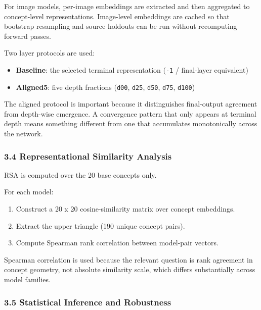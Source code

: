 \documentclass[
]{article}
\providecommand{\tightlist}{%
  \setlength{\itemsep}{0pt}\setlength{\parskip}{0pt}}
\begin{document}
For image models, per-image embeddings are extracted and then aggregated
to concept-level representations. Image-level embeddings are cached so
that bootstrap resampling and source holdouts can be run without
recomputing forward passes.

Two layer protocols are used:

\begin{itemize}
\tightlist
\item
  \textbf{Baseline}: the selected terminal representation (\texttt{-1} /
  final-layer equivalent)
\item
  \textbf{Aligned5}: five depth fractions (\texttt{d00}, \texttt{d25},
  \texttt{d50}, \texttt{d75}, \texttt{d100})
\end{itemize}

The aligned protocol is important because it distinguishes final-output
agreement from depth-wise emergence. A convergence pattern that only
appears at terminal depth means something different from one that
accumulates monotonically across the network.

\subsubsection{3.4 Representational Similarity
Analysis}\label{representational-similarity-analysis}

RSA is computed over the 20 base concepts only.

For each model:

\begin{enumerate}
\def\labelenumi{\arabic{enumi}.}
\tightlist
\item
  Construct a 20 x 20 cosine-similarity matrix over concept embeddings.
\item
  Extract the upper triangle (190 unique concept pairs).
\item
  Compute Spearman rank correlation between model-pair vectors.
\end{enumerate}

Spearman correlation is used because the relevant question is rank
agreement in concept geometry, not absolute similarity scale, which
differs substantially across model families.

\subsubsection{3.5 Statistical Inference and
Robustness}\label{statistical-inference-and-robustness}
\end{document}
